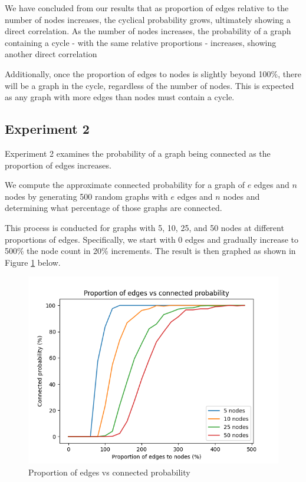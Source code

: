 \documentclass[titlepage]{article}
\begin{document}
We have concluded from our results that as proportion of edges relative to the number of nodes increases, the cyclical probability grows, ultimately showing a direct correlation. As the number of nodes increases, the probability of a graph containing a cycle - with the same relative proportions - increases, showing another direct correlation

Additionally, once the proportion of edges to nodes is slightly beyond 100\%, there will be a graph in the cycle, regardless of the number of nodes. This is expected as any graph with more edges than nodes must contain a cycle.

\subsection{Experiment 2}

Experiment 2 examines the probability of a graph being connected as the proportion of edges increases.

We compute the approximate connected probability for a graph of $e$ edges and $n$ nodes by generating 500 random graphs with $e$ edges and $n$ nodes and determining what percentage of those graphs are connected.

This process is conducted for graphs with 5, 10, 25, and 50 nodes at different proportions of edges. Specifically, we start with 0 edges and gradually increase to 500\% the node count in 20\% increments. The result is then graphed as shown in Figure \ref{fig:edges_vs_connected} below.

\begin{figure}[H]
    \centering
    \includegraphics[width=0.8\linewidth]{experiment_2.png}
    \caption{Proportion of edges vs connected probability}
    \label{fig:edges_vs_connected}
\end{figure}
\end{document}
